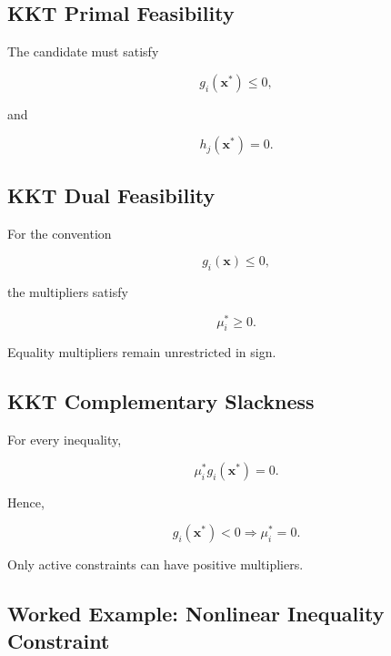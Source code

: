 \subsection{KKT Primal Feasibility}
\label{subsec:nlp-kkt-primal-feasibility}

The candidate must satisfy

\[
\boxed{
g_i(\mathbf{x}^*)\leq0,
}
\]

and

\[
\boxed{
h_j(\mathbf{x}^*)=0.
}
\]

\subsection{KKT Dual Feasibility}
\label{subsec:nlp-kkt-dual-feasibility}

For the convention

\[
g_i(\mathbf{x})\leq0,
\]

the multipliers satisfy

\[
\boxed{
\mu_i^*\geq0.
}
\]

Equality multipliers remain unrestricted in sign.

\subsection{KKT Complementary Slackness}
\label{subsec:nlp-kkt-complementary-slackness}

For every inequality,

\[
\boxed{
\mu_i^*
g_i(\mathbf{x}^*)
=
0.
}
\]

Hence,

\[
g_i(\mathbf{x}^*)<0
\Rightarrow
\mu_i^*=0.
\]

Only active constraints can have positive multipliers.

\subsection{Worked Example: Nonlinear Inequality Constraint}
\label{subsec:worked-nlp-inequality}

